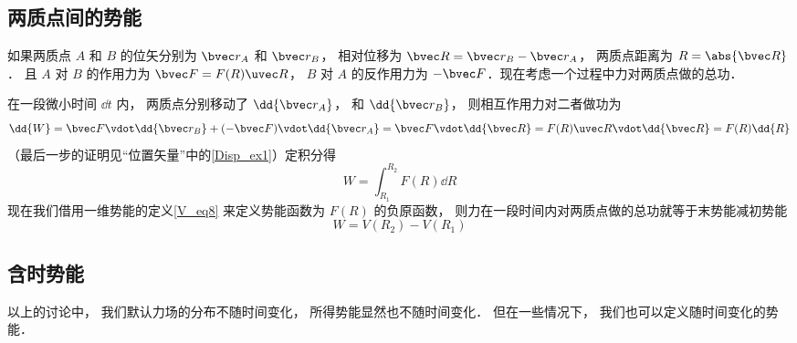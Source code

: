 \subsection{两质点间的势能}

如果两质点 $A$ 和 $B$ 的位矢分别为 $\bvec r_A$ 和 $\bvec r_B$， 相对位移为 $\bvec R = \bvec r_B - \bvec r_A$， 两质点距离为 $R = \abs{\bvec R}$． 且 $A$ 对 $B$ 的作用力为 $\bvec F = F(R) \uvec R$， $B$ 对 $A$ 的反作用力为 $-\bvec F$．现在考虑一个过程中力对两质点做的总功．

在一段微小时间 $\dd{t}$ 内， 两质点分别移动了 $\dd{\bvec r_A}$， 和 $\dd{\bvec r_B}$， 则相互作用力对二者做功为
\begin{equation}
\dd{W} = \bvec F \vdot \dd{\bvec r_B} + (- \bvec F) \vdot \dd{\bvec r_A} = \bvec F \vdot \dd{\bvec R}
= F(R)\uvec R\vdot \dd{\bvec R} = F(R) \dd{R}
\end{equation}
（最后一步的证明见“位置矢量”中的\autoref{Disp_ex1}）定积分得
\begin{equation}
W = \int_{R_1}^{R_2}  F(R) \dd{R}
\end{equation}
现在我们借用一维势能的定义\autoref{V_eq8} 来定义势能函数为 $F(R)$ 的负原函数， 则力在一段时间内对两质点做的总功就等于末势能减初势能
\begin{equation}\label{V_eq20}
W = V(R_2) - V(R_1)
\end{equation}


\subsection{含时势能}
以上的讨论中， 我们默认力场的分布不随时间变化， 所得势能显然也不随时间变化． 但在一些情况下， 我们也可以定义随时间变化的势能．








